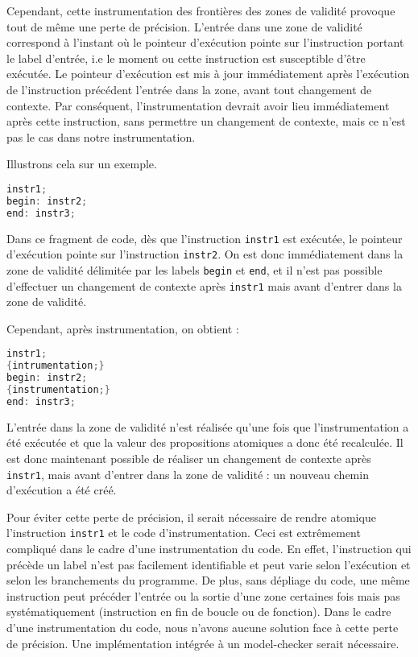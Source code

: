 Cependant, cette instrumentation des frontières des zones de validité
provoque tout de même une perte de précision. L'entrée dans une zone de
validité correspond à l'instant où le pointeur d'exécution pointe sur
l'instruction portant le label d'entrée, i.e le moment ou cette
instruction est susceptible d'être exécutée. Le pointeur d'exécution est
mis à jour immédiatement après l'exécution de l'instruction précédent
l'entrée dans la zone, avant tout changement de contexte. Par
conséquent, l'instrumentation devrait avoir lieu immédiatement après
cette instruction, sans permettre un changement de contexte, mais ce
n'est pas le cas dans notre instrumentation.

Illustrons cela sur un exemple.

\begin{lstlisting}[language=C]
instr1;
begin: instr2;
end: instr3;
\end{lstlisting}

Dans ce fragment de code, dès que l'instruction \lstinline!instr1! est
exécutée, le pointeur d'exécution pointe sur l'instruction
\lstinline!instr2!. On est donc immédiatement dans la zone de validité
délimitée par les labels \lstinline!begin! et \lstinline!end!, et il
n'est pas possible d'effectuer un changement de contexte après
\lstinline!instr1! mais avant d'entrer dans la zone de validité.

Cependant, après instrumentation, on obtient :

\begin{lstlisting}[language=C]
instr1;
{intrumentation;}
begin: instr2;
{instrumentation;}
end: instr3;
\end{lstlisting}

L'entrée dans la zone de validité n'est réalisée qu'une fois que
l'instrumentation a été exécutée et que la valeur des propositions
atomiques a donc été recalculée. Il est donc maintenant possible de
réaliser un changement de contexte après \lstinline!instr1!, mais avant
d'entrer dans la zone de validité : un nouveau chemin d'exécution a été
créé.

Pour éviter cette perte de précision, il serait nécessaire de rendre
atomique l'instruction \lstinline!instr1! et le code d'instrumentation.
Ceci est extrêmement compliqué dans le cadre d'une instrumentation du
code. En effet, l'instruction qui précède un label n'est pas facilement
identifiable et peut varie selon l'exécution et selon les branchements
du programme. De plus, sans dépliage du code, une même instruction peut
précéder l'entrée ou la sortie d'une zone certaines fois mais pas
systématiquement (instruction en fin de boucle ou de fonction). Dans le
cadre d'une instrumentation du code, nous n'avons aucune solution face à
cette perte de précision. Une implémentation intégrée à un model-checker
serait nécessaire.


